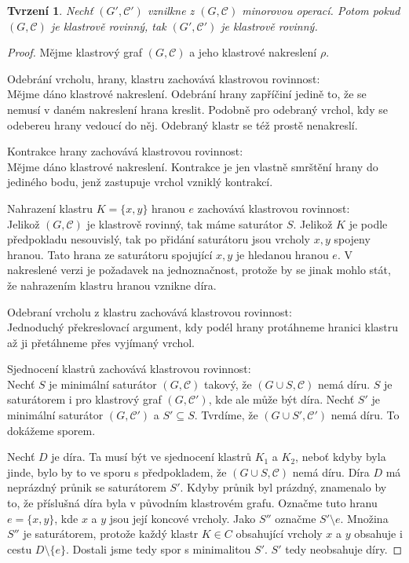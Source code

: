 \documentclass[12pt,a4report]{report}
\newtheorem{tvr}[theorem]{Tvrzení}
\theoremstyle{definition}
\begin{document}
\begin{tvr} Nechť $(G', \mathcal C')$ vznilkne z $(G, \mathcal C)$ minorovou operací. Potom pokud $(G, \mathcal C)$ je klastrově rovinný, tak $(G', \mathcal C')$ je klastrově rovinný.
\label{min_op_zach_kl_rov}
\end{tvr}
\begin{proof}

Mějme klastrový graf $(G, \mathcal C)$ a jeho klastrové nakreslení $\rho$.

Odebrání vrcholu, hrany, klastru zachovává klastrovou rovinnost:\\
Mějme dáno klastrové nakreslení. Odebrání hrany zapříčiní jedině to, že se nemusí v daném nakreslení hrana kreslit. Podobně pro odebraný vrchol, kdy se odebereu hrany vedoucí do něj. Odebraný klastr se též prostě nenakreslí.

Kontrakce hrany zachovává klastrovou rovinnost:\\
Mějme dáno klastrové nakreslení. Kontrakce je jen vlastně smrštění hrany do jediného bodu, jenž zastupuje vrchol vzniklý kontrakcí.

Nahrazení klastru $K=\{x,y\}$ hranou $e$ zachovává klastrovou rovinnost:\\
Jelikož $(G, \mathcal C)$ je klastrově rovinný, tak máme saturátor $S$. Jelikož $K$ je podle předpokladu nesouvislý, tak po přidání saturátoru jsou vrcholy $x, y$ spojeny hranou. Tato hrana ze saturátoru spojující $x,y$ je hledanou hranou $e$. V nakreslené verzi je požadavek na jednoznačnost, protože by se jinak mohlo stát, že nahrazením klastru hranou vznikne díra.  

Odebraní vrcholu z klastru zachovává klastrovou rovinnost:\\
Jednoduchý překreslovací argument, kdy podél hrany protáhneme hranici klastru až ji přetáhneme přes vyjímaný vrchol.

Sjednocení klastrů zachovává klastrovou rovinnost:\\
Nechť $S$ je minimální saturátor $(G,\mathcal C)$ takový, že $(G \cup S,\mathcal C)$ nemá díru. $S$ je saturátorem i pro klastrový graf $(G, \mathcal C')$, kde ale může být díra.
Nechť $S'$ je  minimální saturátor $(G, \mathcal C')$ a $S' \subseteq S$. Tvrdíme, že $(G \cup S',\mathcal C')$ nemá díru. To dokážeme sporem.

Nechť $D$ je díra. Ta musí být ve sjednocení klastrů $K_1$ a $K_2$, neboť kdyby byla jinde, bylo by to ve sporu s předpokladem, že $(G \cup S, \mathcal C)$ nemá díru.
Díra $D$ má neprázdný průnik se saturátorem $S'$. Kdyby průnik byl prázdný, znamenalo by to, že příslušná díra byla v původním klastrovém grafu. Označme tuto hranu $e = \{x,y\}$, kde $x$ a $y$ jsou její koncové vrcholy.
Jako $S''$ označme $S' \setminus e$. Množina $S''$ je saturátorem, protože každý klastr $K \in C$ obsahující vrcholy  $x$ a $y$ obsahuje i cestu $D \setminus \{e\}$. Dostali jsme tedy spor s minimalitou $S'$. $S'$ tedy neobsahuje díry.
\end{proof}
\end{document}
